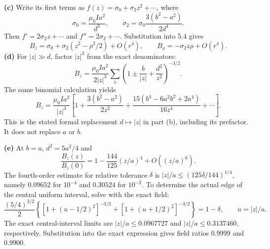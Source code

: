 \textbf{(c)} Write its first terms as $f(z)=\sigma_0+\sigma_2z^2+\cdots$,
where
\[
\sigma_0=\frac{\mu_0Ia^2}{d^3},\qquad
\sigma_2=\sigma_0\frac{3(b^2-a^2)}{2d^4}.
\]
Then $f'=2\sigma_2z+\cdots$ and $f''=2\sigma_2+\cdots$.
Substitution into 5.4 gives
\[
\boxed{B_z=\sigma_0+\sigma_2(z^2-\rho^2/2)+O(r^4),\qquad
B_\rho=-\sigma_2z\rho+O(r^4).}
\]
\textbf{(d)} For $|z|\gg d$, factor $|z|^3$ from the exact denominators:
\[
B_z=\frac{\mu_0Ia^2}{2|z|^3}
\sum_{\pm}\left(1\pm\frac b{|z|}+\frac{d^2}{z^2}\right)^{-3/2}.
\]
The same binomial calculation yields
\[
\boxed{B_z=\frac{\mu_0Ia^2}{|z|^3}
\left[1+\frac{3(b^2-a^2)}{2z^2}
+\frac{15(b^4-6a^2b^2+2a^4)}{16z^4}+\cdots\right].}
\]
This is the stated formal replacement $d\mapsto|z|$ in part (b),
including its prefactor. It does not replace $a$ or $b$.

\textbf{(e)} At $b=a$, $d^2=5a^2/4$ and
\[
\frac{B_z(z)}{B_z(0)}
=1-\frac{144}{125}(z/a)^4+O((z/a)^6).
\]
The fourth-order estimate for relative tolerance $\delta$ is
$|z|/a\le(125\delta/144)^{1/4}$, namely $0.09652$ for $10^{-4}$
and $0.30524$ for $10^{-2}$. To determine the actual edge of the
central uniform interval, solve with the exact field:
\[
\frac{(5/4)^{3/2}}2
\left\{[1+(u-1/2)^2]^{-3/2}+[1+(u+1/2)^2]^{-3/2}\right\}
=1-\delta,\qquad u=|z|/a.
\]
The exact central-interval limits are
$\boxed{|z|/a\le0.0967727}$ and $\boxed{|z|/a\le0.3137460}$,
respectively. Substitution into the exact expression gives field ratios
$0.9999$ and $0.9900$.


